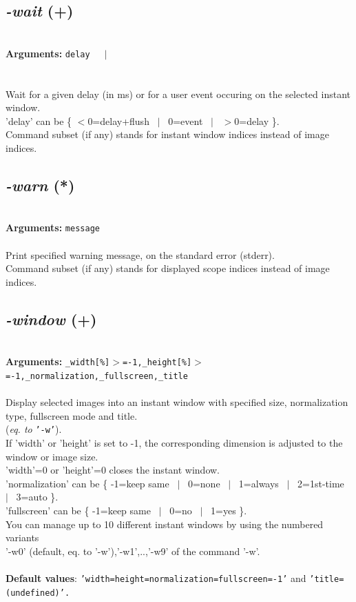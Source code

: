 \documentclass[a4paper,11pt,twoside]{book}
\begin{document}
\subsection{\emph{-wait} (+)}\vspace*{-0.5em}
~\\\textbf{Arguments: } 
{\small \texttt{delay}}~~~$|$\\
\\~\\
Wait for a given delay (in ms) or for a user event occuring on the selected instant window.
~\\'delay' can be \{ $<$0=delay+flush ~$|$~  0=event ~$|$~ $>$0=delay \}.
~\\Command subset (if any) stands for instant window indices instead of image indices.


\subsection{\emph{-warn} (*)}\vspace*{-0.5em}
~\\\textbf{Arguments: } 
{\small \texttt{message}}\\~\\
Print specified warning message, on the standard error (stderr).
~\\Command subset (if any) stands for displayed scope indices instead of image indices.


\subsection{\emph{-window} (+)}\vspace*{-0.5em}
~\\\textbf{Arguments: } 
{\small \texttt{\_width[\%]$>$=-1,\_height[\%]$>$=-1,\_normalization,\_fullscreen,\_title}}\\~\\
Display selected images into an instant window with specified size, normalization type,
fullscreen mode and title.
~\\(\emph{eq. to} {\small \texttt{'-w'}}).
~\\If 'width' or 'height' is set to -1, the corresponding dimension is adjusted to the window
or image size.
~\\'width'=0 or 'height'=0 closes the instant window.
~\\'normalization' can be \{ -1=keep same ~$|$~ 0=none ~$|$~ 1=always ~$|$~ 2=1st-time ~$|$~ 3=auto \}.
~\\'fullscreen' can be \{ -1=keep same ~$|$~ 0=no ~$|$~ 1=yes \}.
~\\You can manage up to 10 different instant windows by using the numbered variants
~\\'-w0' (default, eq. to '-w'),'-w1',..,'-w9' of the command '-w'.
~\\~\\\textbf{Default values}: {\small \texttt{'width=height=normalization=fullscreen=-1'} and \texttt{'title=(undefined)'.}}
\end{document}
